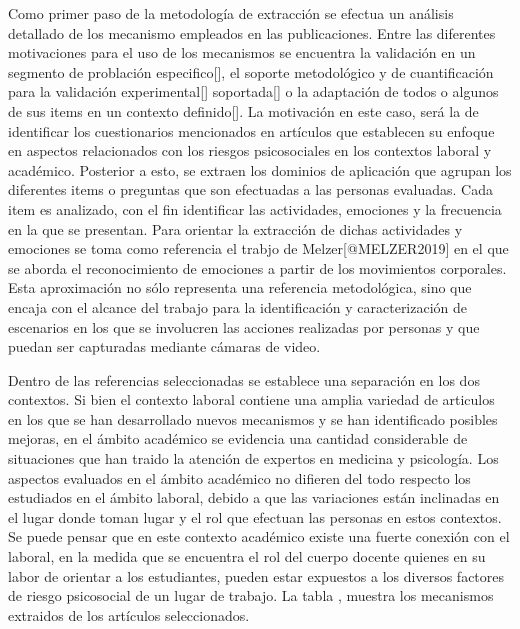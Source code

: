 \documentclass[]{article}
\begin{document}
Como primer paso de la metodología de extracción se efectua un análisis
detallado de los mecanismo empleados en las publicaciones. Entre las
diferentes motivaciones para el uso de los mecanismos se encuentra la
validación en un segmento de problación especifico{[}{]}, el soporte
metodológico y de cuantificación para la validación experimental{[}{]}
soportada{[}{]} o la adaptación de todos o algunos de sus items en un
contexto definido{[}{]}. La motivación en este caso, será la de
identificar los cuestionarios mencionados en artículos que establecen su
enfoque en aspectos relacionados con los riesgos psicosociales en los
contextos laboral y académico. Posterior a esto, se extraen los dominios
de aplicación que agrupan los diferentes items o preguntas que son
efectuadas a las personas evaluadas. Cada item es analizado, con el fin
identificar las actividades, emociones y la frecuencia en la que se
presentan. Para orientar la extracción de dichas actividades y emociones
se toma como referencia el trabjo de Melzer{[}@MELZER2019{]} en el que
se aborda el reconocimiento de emociones a partir de los movimientos
corporales. Esta aproximación no sólo representa una referencia
metodológica, sino que encaja con el alcance del trabajo para la
identificación y caracterización de escenarios en los que se involucren
las acciones realizadas por personas y que puedan ser capturadas
mediante cámaras de video.

Dentro de las referencias seleccionadas se establece una separación en
los dos contextos. Si bien el contexto laboral contiene una amplia
variedad de articulos en los que se han desarrollado nuevos mecanismos y
se han identificado posibles mejoras, en el ámbito académico se
evidencia una cantidad considerable de situaciones que han traido la
atención de expertos en medicina y psicología. Los aspectos evaluados en
el ámbito académico no difieren del todo respecto los estudiados en el
ámbito laboral, debido a que las variaciones están inclinadas en el
lugar donde toman lugar y el rol que efectuan las personas en estos
contextos. Se puede pensar que en este contexto académico existe una
fuerte conexión con el laboral, en la medida que se encuentra el rol del
cuerpo docente quienes en su labor de orientar a los estudiantes, pueden
estar expuestos a los diversos factores de riesgo psicosocial de un
lugar de trabajo. La tabla , muestra los mecanismos extraidos de los
artículos seleccionados.
\end{document}

